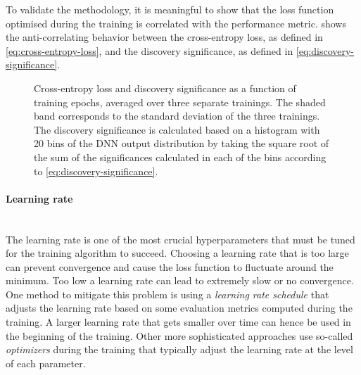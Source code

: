 To validate the methodology, it is meaningful to show that the loss function optimised during the training is correlated with the performance metric. 
 shows the anti-correlating behavior between the cross-entropy loss, as defined in \cref{eq:cross-entropy-loss}, and the discovery significance, as defined in \cref{eq:discovery-significance}.

\begin{figure}[t]
    \caption{Cross-entropy loss and discovery significance as a function of training epochs, averaged over three separate trainings. The shaded band corresponds to the standard deviation of the three trainings. The discovery significance is calculated based on a histogram with 20 bins of the DNN output distribution by taking the square root of the sum of the significances calculated in each of the bins according to \cref{eq:discovery-significance}.}
    \label{fig:loss-vs-sign}
\end{figure}



\paragraph{Learning rate} \mbox{}\\
The learning rate is one of the most crucial hyperparameters that must be tuned for the training algorithm to succeed. Choosing a learning rate that is too large can prevent convergence and cause the loss function to fluctuate around the minimum. Too low a learning rate can lead to extremely slow or no convergence. 
One method to mitigate this problem is using a \emph{learning rate schedule} that adjusts the learning rate based on some evaluation metrics computed during the training. A larger learning rate that gets smaller over time can hence be used in the beginning of the training. 
Other more sophisticated approaches use so-called \emph{optimizers} during the training that typically adjust the learning rate at the level of each parameter.

